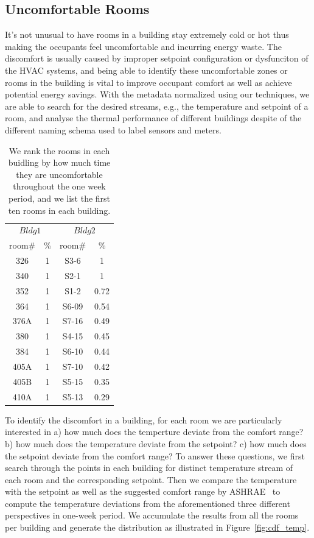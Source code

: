\subsection{Uncomfortable Rooms}
It's not unusual to have rooms in a building stay extremely cold or hot thus making the occupants feel uncomfortable and incurring energy waste. The discomfort is usually caused by improper setpoint configuration or dysfunciton of the HVAC systems, and being able to identify these uncomfortable zones or rooms in the building is vital to improve occupant comfort as well as achieve potential energy savings. With the metadata normalized using our techniques, we are able to search for the desired streams, e.g., the temperature and setpoint of a room, and analyse the thermal performance of different buildings despite of the different naming schema used to label sensors and meters.

\begin{table}[ht!]
 \begin{center}
	\begin{tabular}{|c|c|c|c|}
	\multicolumn{2}{c}{$Bldg 1$}
	 & \multicolumn{2}{c}{$Bldg 2$}\\
	\cline{1-4} 
	 room\# & \% & room\# & \%\\
	\cline{1-4}
	 326 & 1 & S3-6 & 1\\
	\cline{1-4}
	 340 & 1 & S2-1 & 1\\
	\cline{1-4}
	352 & 1 & S1-2 & 0.72\\
	\cline{1-4}
	364 & 1 & S6-09 & 0.54\\
	\cline{1-4}
	376A & 1 & S7-16 & 0.49\\
	\cline{1-4}
	380 & 1 & S4-15 & 0.45\\
	\cline{1-4}
	384 & 1 & S6-10 & 0.44\\
	\cline{1-4}
	405A & 1 & S7-10 & 0.42\\
	\cline{1-4}
	405B & 1 & S5-15 & 0.35\\
	\cline{1-4}
	410A & 1 & S5-13 & 0.29\\
	\cline{1-4}
	\end{tabular}
 \end{center}
 \caption{We rank the rooms in each buidling by how much time they are uncomfortable throughout the one week period, and we list the first ten rooms in each building.}
 \label{tab:uncmft}
\end{table}

To identify the discomfort in a building, for each room we are particularly interested in a) how much does the temperture deviate from the comfort range? b) how much does the temperature deviate from the setpoint? c) how much does the setpoint deviate from the comfort range? To answer these questions, we first search through the points in each building for distinct temperature stream of each room and the corresponding setpoint. Then we compare the temperature with the setpoint as well as the suggested comfort range by ASHRAE~\cite{} to compute the temperature deviations from the aforementioned three different perspectives in one-week period. We accumulate the results from all the rooms per building and generate the distribution as illustrated in Figure~\ref{fig:cdf_temp}.

